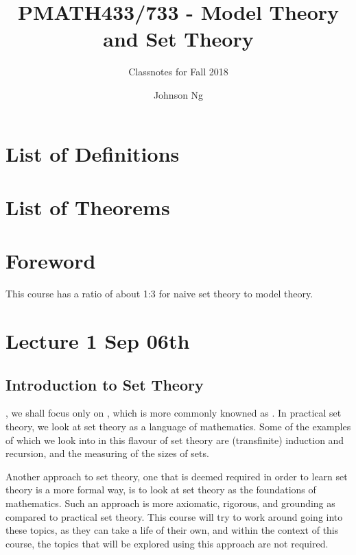 \documentclass[notoc,notitlepage]{tufte-book}
\title{PMATH433/733 - Model Theory and Set Theory}
\author{Johnson Ng}
\subtitle{Classnotes for Fall 2018}
\begin{document}
\hypersetup{pageanchor=false}
\maketitle
\hypersetup{pageanchor=true}
\tableofcontents

\chapter*{\faBook \enspace List of Definitions}

\chapter*{\faCoffee \enspace List of Theorems}

\chapter*{Foreword}%
\label{chp:foreword}

This course has a ratio of about 1:3 for naive set theory to model theory.


\chapter{Lecture 1 Sep 06th}%
\label{chp:lecture_1_sep_06th}

\section{Introduction to Set Theory}%
\label{sec:introduction_to_set_theory}

, we shall focus only on , which is more commonly knowned as . In practical set theory, we look at set theory as a language of mathematics. Some of the examples of which we look into in this flavour of set theory are (transfinite) induction and recursion, and the measuring of the sizes of sets.

Another approach to set theory, one that is deemed required in order to learn set theory is a more formal way, is to look at set theory as the foundations of mathematics. Such an approach is more axiomatic, rigorous, and grounding as compared to practical set theory. This course will try to work around going into these topics, as they can take a life of their own, and within the context of this course, the topics that will be explored using this approach are not required.
\end{document}
